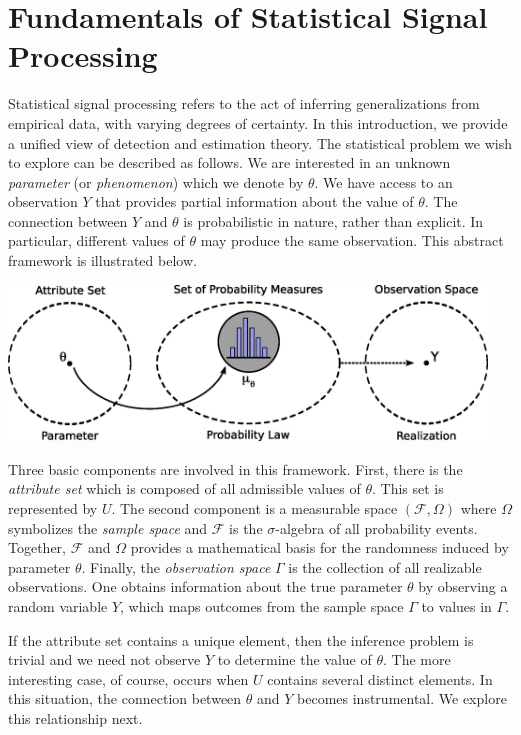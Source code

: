 \chapter[Introduction]{Fundamentals of Statistical Signal Processing}

Statistical signal processing refers to the act of inferring generalizations from empirical data, with varying degrees of certainty.
In this introduction, we provide a unified view of detection and estimation theory.
The statistical problem we wish to explore can be described as follows.
We are interested in an unknown \emph{parameter} (or \emph{phenomenon}) which we denote by $\theta$.
We have access to an observation $Y$ that provides partial information about the value of $\theta$.
The connection between $Y$ and $\theta$ is probabilistic in nature, rather than explicit.
In particular, different values of $\theta$ may produce the same observation.
This abstract framework is illustrated below.

\begin{center}
\includegraphics[width=5in]{Figures/1Chapter/Inference}
\end{center}

Three basic components are involved in this framework.
First, there is the \emph{attribute set} which is composed of all admissible values of $\theta$.
This set is represented by $U$.
The second component is a measurable space $(\mathcal{F}, \Omega)$ where $\Omega$ symbolizes the \emph{sample space} and $\mathcal{F}$ is the $\sigma$-algebra of all probability events.
Together, $\mathcal{F}$ and $\Omega$ provides a mathematical basis for the randomness induced by parameter $\theta$.
Finally, the \emph{observation space} $\Gamma$ is the collection of all realizable observations.
One obtains information about the true parameter $\theta$ by observing a random variable $Y$, which maps outcomes from the sample space $\Gamma$ to values in $\Gamma$.

If the attribute set contains a unique element, then the inference problem is trivial and we need not observe $Y$ to determine the value of $\theta$.
The more interesting case, of course, occurs when $U$ contains several distinct elements.
In this situation, the connection between $\theta$ and $Y$ becomes instrumental.
We explore this relationship next.

